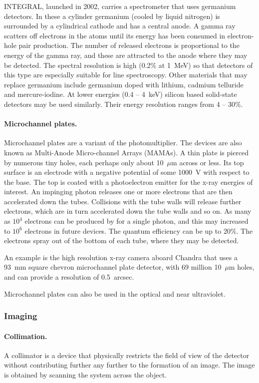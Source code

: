 INTEGRAL, launched in 2002, carries a spectrometer that uses germanium detectors. In these
a cylinder germanium (cooled by liquid nitrogen) is surrounded by a cylindrical cathode and has
a central anode. A gamma ray scatters off electrons in the atoms until its energy has been
consumed in electron-hole pair production. The number of released electrons is proportional
to the energy of the gamma ray, and these are attracted to the anode where they may be
detected. The spectral resolution is high (0.2\% at 1~MeV) so that detectors of this type
are especially suitable for line spectroscopy. Other materials that may replace germanium
include germanium doped with lithium, cadmium telluride and mercure-iodine. At lower energies
(0.4 -- 4~keV) silicon based  solid-state detectors may be used similarly. Their energy resolution
ranges from 4 -- 30\%.

\paragraph{Microchannel plates.} Microchannel plates are a variant of the photomultiplier. The devices 
are also known as Multi-Anode Micro-channel Arrays (MAMAs). A thin plate is pierced by numerous tiny holes, each perhaps only about 10~$\mu$m across or less. Its top surface is
an electrode with a negative potential of some 1000~V with respect to the base. The top is
coated with a photoelectron emitter for the x-ray energies of interest. An impinging photon
releases one or more electrons that are then accelerated down the tubes. Collisions with the tube
walls will release further electrons, which are in turn accelerated down the tube walls and so on.
As many as $10^4$ electrons can be produced by for a single photon, and this may increased
to $10^6$ electrons in future devices. The quantum efficiency can be up to 20\%. The electrons
spray out of the bottom of each tube, where they may be detected. 

An example is the high resolution x-ray camera aboard Chandra that uses a 93~mm square
chevron microchannel plate detector, with 69 million 10~$\mu$m holes, and can provide a
resolution of 0.5~arcsec. 

Microchannel plates can also be used in the optical and near ultraviolet.

\subsubsection{Imaging}

\paragraph{Collimation.} A collimator is a device that physically restricts the field of view of the detector
without contributing further any further to the formation of an image. The image is obtained by 
scanning the system across the object. 


